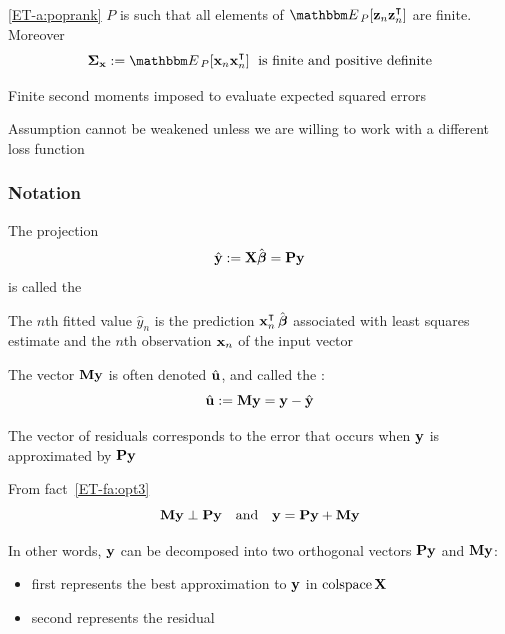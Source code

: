\begin{frame}
  
    \vspace{2em}
    \Ass\eqref{ET-a:poprank}
    $P$ is such that all elements of $\EE_P [ \boldz_n \boldz_n^\T]$ are finite. 
    Moreover
    \begin{equation}
        \label{eq:smx}
        \Sigmax := \EE_P [ \boldx_n \boldx_n^\T ] \; \text{ is finite and positive definite}
    \end{equation}

    \vspace{.7em}
    Finite second moments imposed to evaluate expected squared errors 
    
    Assumption cannot be weakened unless we are willing to work with a 
    different loss function
\end{frame}

\begin{frame}\frametitle{Notation}
    
    \vspace{2em}
    The projection
    \begin{equation*}
        \hat {\mathbf y} := \mathbf X \hat {\boldsymbol \beta} = \mathbf P {\mathbf y}
    \end{equation*}
    is called the 
    
    The $n$th fitted value $\hat
    y_n$ is the prediction $\boldx_n^\T \, \hboldbeta$ associated with least
    squares estimate
    and the $n$th observation ${\mathbf x}_n$ of the input vector
    
    \vspace{.7em}
    The vector $\mathbf M
    {\mathbf y}$ is often denoted $\hat {\mathbf u}$, and called the :
    \begin{equation*}
        \hat {\mathbf u} := \mathbf M {\mathbf y} = {\mathbf y} - \hat {\mathbf y}
    \end{equation*}
\end{frame}

\begin{frame}

    \vspace{2em}
    The vector of residuals corresponds to the error that occurs when ${\mathbf y}$ is
    approximated by $\mathbf P {\mathbf y}$
    
    From fact~\ref{ET-fa:opt3}
    \begin{equation}
        \label{eq:orr}
        \mathbf M {\mathbf y} \perp \mathbf P {\mathbf y} 
        \quad \text{and} \quad 
        {\mathbf y} =  \mathbf P {\mathbf y} + \mathbf M {\mathbf y}
    \end{equation}
    
    \vspace{.7em}
    In other words, ${\mathbf y}$ can be decomposed into two orthogonal vectors $\mathbf P
    {\mathbf y}$ and $\mathbf M {\mathbf y}$:
    \begin{itemize}
        \item first represents the best approximation
    to ${\mathbf y}$ in $\operatorname{colspace} \mathbf X$
        \item second represents the residual
    \end{itemize}

\end{frame}

